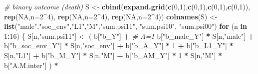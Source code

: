 \documentclass[
]{book}
\newenvironment{Shaded}{\begin{snugshade}}{\end{snugshade}}
\newcommand{\AttributeTok}[1]{\textcolor[rgb]{0.13,0.29,0.53}{#1}}
\newcommand{\CommentTok}[1]{\textcolor[rgb]{0.56,0.35,0.01}{\textit{#1}}}
\newcommand{\ConstantTok}[1]{\textcolor[rgb]{0.56,0.35,0.01}{#1}}
\newcommand{\ControlFlowTok}[1]{\textcolor[rgb]{0.13,0.29,0.53}{\textbf{#1}}}
\newcommand{\DecValTok}[1]{\textcolor[rgb]{0.00,0.00,0.81}{#1}}
\newcommand{\FunctionTok}[1]{\textcolor[rgb]{0.13,0.29,0.53}{\textbf{#1}}}
\newcommand{\NormalTok}[1]{#1}
\newcommand{\OtherTok}[1]{\textcolor[rgb]{0.56,0.35,0.01}{#1}}
\newcommand{\SpecialCharTok}[1]{\textcolor[rgb]{0.81,0.36,0.00}{\textbf{#1}}}
\newcommand{\StringTok}[1]{\textcolor[rgb]{0.31,0.60,0.02}{#1}}
\begin{document}
\begin{Shaded}
\begin{Highlighting}[]
  \CommentTok{\# binary outcome (death)}
\NormalTok{  S }\OtherTok{\textless{}{-}} \FunctionTok{cbind}\NormalTok{(}\FunctionTok{expand.grid}\NormalTok{(}\FunctionTok{c}\NormalTok{(}\DecValTok{0}\NormalTok{,}\DecValTok{1}\NormalTok{),}\FunctionTok{c}\NormalTok{(}\DecValTok{0}\NormalTok{,}\DecValTok{1}\NormalTok{),}\FunctionTok{c}\NormalTok{(}\DecValTok{0}\NormalTok{,}\DecValTok{1}\NormalTok{),}\FunctionTok{c}\NormalTok{(}\DecValTok{0}\NormalTok{,}\DecValTok{1}\NormalTok{)), }\FunctionTok{rep}\NormalTok{(}\ConstantTok{NA}\NormalTok{,}\AttributeTok{n=}\DecValTok{2}\SpecialCharTok{\^{}}\DecValTok{4}\NormalTok{), }
             \FunctionTok{rep}\NormalTok{(}\ConstantTok{NA}\NormalTok{,}\AttributeTok{n=}\DecValTok{2}\SpecialCharTok{\^{}}\DecValTok{4}\NormalTok{), }\FunctionTok{rep}\NormalTok{(}\ConstantTok{NA}\NormalTok{,}\AttributeTok{n=}\DecValTok{2}\SpecialCharTok{\^{}}\DecValTok{4}\NormalTok{))}
  \FunctionTok{colnames}\NormalTok{(S) }\OtherTok{\textless{}{-}} \FunctionTok{list}\NormalTok{(}\StringTok{"male"}\NormalTok{,}\StringTok{"soc\_env"}\NormalTok{,}\StringTok{"L1"}\NormalTok{,}\StringTok{"M"}\NormalTok{,}\StringTok{"sum.psi11"}\NormalTok{, }
                      \StringTok{"sum.psi10"}\NormalTok{, }\StringTok{"sum.psi00"}\NormalTok{)}
  \ControlFlowTok{for}\NormalTok{ (n }\ControlFlowTok{in} \DecValTok{1}\SpecialCharTok{:}\DecValTok{16}\NormalTok{) \{}
\NormalTok{    S[n,}\StringTok{"sum.psi11"}\NormalTok{] }\OtherTok{\textless{}{-}}\NormalTok{  ( b[}\StringTok{"b\_Y"}\NormalTok{] }\SpecialCharTok{+}                                           \CommentTok{\# A=1}
\NormalTok{                             b[}\StringTok{"b\_male\_Y"}\NormalTok{] }\SpecialCharTok{*}\NormalTok{ S[n,}\StringTok{"male"}\NormalTok{] }\SpecialCharTok{+} 
\NormalTok{                             b[}\StringTok{"b\_soc\_env\_Y"}\NormalTok{] }\SpecialCharTok{*}\NormalTok{ S[n,}\StringTok{"soc\_env"}\NormalTok{] }\SpecialCharTok{+} 
\NormalTok{                             b[}\StringTok{"b\_A\_Y"}\NormalTok{] }\SpecialCharTok{*} \DecValTok{1} \SpecialCharTok{+} 
\NormalTok{                             b[}\StringTok{"b\_L1\_Y"}\NormalTok{] }\SpecialCharTok{*}\NormalTok{ S[n,}\StringTok{"L1"}\NormalTok{] }\SpecialCharTok{+}
\NormalTok{                             b[}\StringTok{"b\_M\_Y"}\NormalTok{] }\SpecialCharTok{*}\NormalTok{ S[n,}\StringTok{"M"}\NormalTok{] }\SpecialCharTok{+}
\NormalTok{                             b[}\StringTok{"b\_AM\_Y"}\NormalTok{] }\SpecialCharTok{*} \DecValTok{1} \SpecialCharTok{*}\NormalTok{ S[n,}\StringTok{"M"}\NormalTok{] }\SpecialCharTok{*}\NormalTok{ b[}\StringTok{"A.M.inter"}\NormalTok{] ) }\SpecialCharTok{*}

\end{Highlighting}
\end{Shaded}
\end{document}
